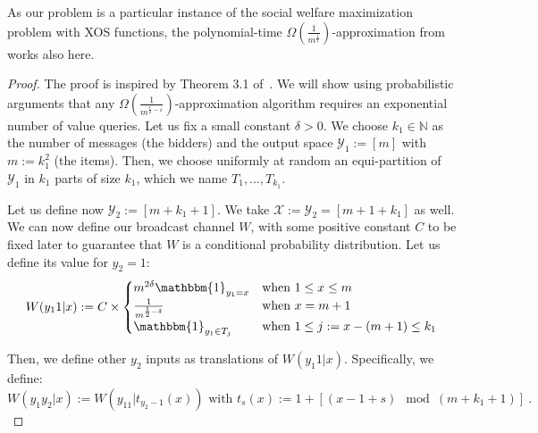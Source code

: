 \begin{rk}
  As our problem is a particular instance of the social welfare maximization problem with \textrm{XOS} functions, the polynomial-time $\Omega\left(\frac{1}{m^{\frac{1}{2}}}\right)$-approximation from~\cite{DS06} works also here.
\end{rk}

\begin{proof}
  The proof is inspired by Theorem 3.1 of~\cite{MSV08}. We will show using probabilistic arguments that any $\Omega\left(\frac{1}{m^{\frac{1}{2}-\varepsilon}}\right)$-approximation algorithm requires an exponential number of value queries.
  Let us fix a small constant $\delta > 0$. We choose $k_1 \in \mathbb{N}$ as the number of messages (the bidders) and the output space $\mathcal{Y}_1 := [m]$ with $m := k_1^2$ (the items). Then, we choose uniformly at random an equi-partition of $\mathcal{Y}_1$ in $k_1$ parts of size $k_1$, which we name $T_1, \ldots, T_{k_1}$.

  Let us define now $\mathcal{Y}_2 := [m+k_1+1]$. We take $\mathcal{X} := \mathcal{Y}_2 = [m+1+k_1]$ as well. We can now define our broadcast channel $W$, with some positive constant $C$ to be fixed later to guarantee that $W$ is a conditional probability distribution. Let us define its value for $y_2=1$:
  \[ W(y_1 1|x) := C\times\begin{cases}
    m^{2\delta}\mathbbm{1}_{y_1=x} & \text{when } 1 \leq x \leq m\\
  \frac{1}{m^{\frac{1}{2}-\delta}} & \text{when } x = m+1\\
  \mathbbm{1}_{y_1 \in T_j} & \text{when } 1 \leq j := x-(m+1) \leq k_1\\
  \end{cases}
  \]

  Then, we define other $y_2$ inputs as translations of $W(y_1 1|x)$. Specifically, we define:
  \[ W(y_1y_2|x) := W(y_11|t_{y_2-1}(x)) \text{ with } t_s(x) := 1 + [(x-1+s) \mod (m+k_1+1)] \ .\] 


\end{proof}

